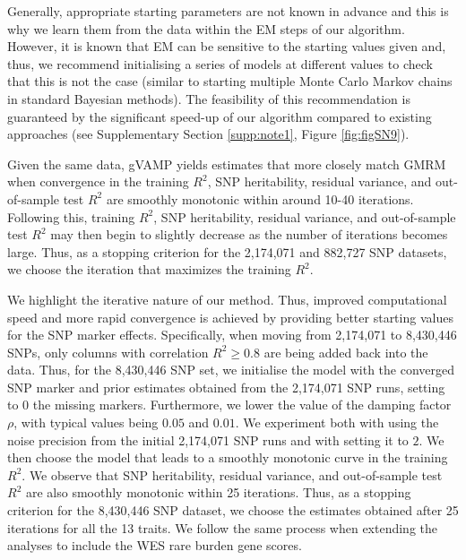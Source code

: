 Generally, appropriate starting parameters are not known in advance and this is why we learn them from the data within the EM steps of our algorithm. However, it is known that EM can be sensitive to the starting values given and, thus, we recommend initialising a series of models at different values to check that this is not the case (similar to starting multiple Monte Carlo Markov chains in standard Bayesian methods). The feasibility of this recommendation is guaranteed by the significant speed-up of our algorithm compared to existing approaches (see Supplementary Section \ref{supp:note1}, Figure \ref{fig:figSN9}). 

Given the same data, gVAMP yields estimates that more closely match GMRM when convergence in the training $R^2$, SNP heritability, residual variance, and out-of-sample test $R^2$ are smoothly monotonic within around 10-40 iterations. Following this, training $R^2$, SNP heritability, residual variance, and out-of-sample test $R^2$ may then begin to slightly decrease as the number of iterations becomes large. Thus, as a stopping criterion for the 2,174,071 and 882,727 SNP datasets, we choose the iteration that maximizes the training $R^2$.

We highlight the iterative nature of our method. Thus, improved computational speed and more rapid convergence is achieved by providing better starting values for the SNP marker effects. Specifically, when moving from 2,174,071 to 8,430,446 SNPs, only columns with correlation $R^2 \geq 0.8$ are being added back into the data. Thus, for the 8,430,446 SNP set, we initialise the model with the converged SNP marker and prior estimates obtained from the 2,174,071 SNP runs, setting to $0$ the missing markers. Furthermore, we lower the value of the damping factor $\rho$, with typical values being $0.05$ and $0.01$. We experiment both with using the noise precision from the initial 2,174,071 SNP runs and with setting it to $2$. We then choose the model that leads to a smoothly monotonic curve in the training $R^2$. We observe that SNP heritability, residual variance, and out-of-sample test $R^2$ are also smoothly monotonic within 25 iterations. Thus, as a stopping criterion for the 8,430,446 SNP dataset, we choose the estimates obtained after 25 iterations for all the 13 traits. We follow the same process when extending the analyses to include the WES rare burden gene scores.

